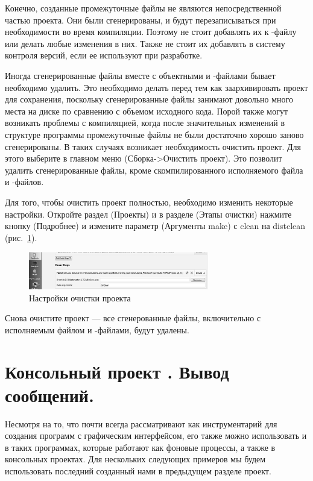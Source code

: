 Конечно, созданные промежуточные файлы не являются непосредственной частью проекта. Они были
сгенерированы, и будут перезаписываться при необходимости во время компиляции. Поэтому не стоит добавлять их к
-файлу или делать любые изменения в них. Также не стоит их добавлять
в систему контроля версий, если ее используют при разработке.

Иногда сгенерированные файлы вместе с объектными и -файлами бывает
необходимо удалить. Это необходимо делать перед тем как заархивировать проект для сохранения, поскольку сгенерированные
файлы занимают довольно много места на диске по сравнению с объемом исходного кода. Порой также могут возникать
проблемы с компиляцией, когда после значительных изменений в структуре программы промежуточные файлы не были достаточно
хорошо заново сгенерированы. В таких случаях возникает необходимость очистить проект. Для этого выберите в главном
меню  (Сборка->Очистить проект).
Это позволит удалить сгенерированные файлы, кроме скомпилированного исполняемого файла и
-файлов.

Для того, чтобы очистить
проект полностью, необходимо изменить некоторые настройки. Откройте раздел
(Проекты) и в разделе
(Этапы очистки) нажмите кнопку
(Подробнее) и измените параметр
 (Аргументы make)
с clean на distclean (рис.~\ref{ch12:refDrawing1}).

\begin{figure}[htb]
\begin{center}
\includegraphics[width=0.7\textwidth]{img/ris_12_2}
\caption{Настройки очистки проекта}
\label{ch12:refDrawing1}
\end{center}
\end{figure}

Снова очистите проект --- все сгенерованные файлы, включительно с исполняемым файлом и -файлами, будут
удалены.

\section[Консольный проект \Sys{Qt}.Вывод сообщений.]{Консольный проект . Вывод сообщений.}
Несмотря на то, что  почти всегда рассматривают как
инструментарий для создания программ с графическим интерфейсом, его также можно использовать и в таких программах,
которые работают как фоновые процессы, а также в консольных проектах. Для нескольких следующих примеров
мы будем использовать последний созданный нами в предыдущем разделе проект.

